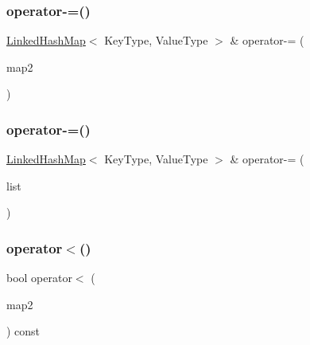 \mbox{\label{classLinkedHashMap_af9f41a756eeffcfbb82c0801ddd1bb71}} 
\subsubsection{\texorpdfstring{operator-\/=()}{operator-=()}\hspace{0.1cm}{\footnotesize\ttfamily [1/2]}}
{\footnotesize\ttfamily \mbox{\hyperlink{classLinkedHashMap}{Linked\+Hash\+Map}}$<$ Key\+Type, Value\+Type $>$ \& operator-\/= (\begin{DoxyParamCaption}\item[{const \mbox{\hyperlink{classLinkedHashMap}{Linked\+Hash\+Map}}$<$ Key\+Type, Value\+Type $>$ \&}]{map2 }\end{DoxyParamCaption})}

\mbox{\label{classLinkedHashMap_a391bba5f3e4ae6dfa5cd29609d3af004}} 
\subsubsection{\texorpdfstring{operator-\/=()}{operator-=()}\hspace{0.1cm}{\footnotesize\ttfamily [2/2]}}
{\footnotesize\ttfamily \mbox{\hyperlink{classLinkedHashMap}{Linked\+Hash\+Map}}$<$ Key\+Type, Value\+Type $>$ \& operator-\/= (\begin{DoxyParamCaption}\item[{std\+::initializer\+\_\+list$<$ std\+::pair$<$ Key\+Type, Value\+Type $>$ $>$}]{list }\end{DoxyParamCaption})}

\mbox{\label{classLinkedHashMap_a0943774682de2481db27e4469efb0eca}} 
\subsubsection{\texorpdfstring{operator$<$()}{operator<()}}
{\footnotesize\ttfamily bool operator$<$ (\begin{DoxyParamCaption}\item[{const \mbox{\hyperlink{classLinkedHashMap}{Linked\+Hash\+Map}}$<$ Key\+Type, Value\+Type $>$ \&}]{map2 }\end{DoxyParamCaption}) const}

